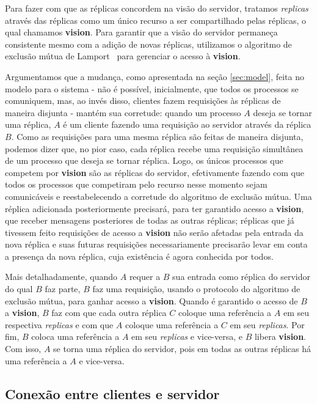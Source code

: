 \documentclass[../main.tex]{subfiles}
\begin{document}
Para fazer com que as réplicas concordem na visão do servidor, tratamos \textit{replicas} através das réplicas como um único recurso a ser compartilhado pelas réplicas, o qual chamamos \textbf{vision}.
Para garantir que a visão do servidor permaneça consistente mesmo com a adição de novas réplicas, utilizamos o algoritmo de exclusão mútua de Lamport~\cite{lamport-logical-clocks} para gerenciar o acesso à \textbf{vision}.

Argumentamos que a mudança, como apresentada na seção \ref{sec:model}, feita no modelo para o sistema - não é possível, inicialmente, que todos os processos se comuniquem, mas, ao invés disso, clientes fazem requisições às réplicas de maneira disjunta - mantém sua corretude: quando um processo $A$ deseja se tornar uma réplica, $A$ é um cliente fazendo uma requisição ao servidor através da réplica $B$.
Como as requisições para uma mesma réplica são feitas de maneira disjunta, podemos dizer que, no pior caso, cada réplica recebe uma requisição simultânea de um processo que deseja se tornar réplica.
Logo, os únicos processos que competem por \textbf{vision} são as réplicas do servidor, efetivamente fazendo com que todos os processos que competiram pelo recurso nesse momento sejam comunicáveis e reestabelecendo a corretude do algoritmo de exclusão mútua.
Uma réplica adicionada posteriormente precisará, para ter garantido acesso a \textbf{vision}, que receber mensagens posteriores de todas as outras réplicas; réplicas que já tivessem feito requisições de acesso a \textbf{vision} não serão afetadas pela entrada da nova réplica e suas futuras requisições necessariamente precisarão levar em conta a presença da nova réplica, cuja existência é agora conhecida por todos.

Mais detalhadamente, quando $A$ requer a $B$ sua entrada como réplica do servidor do qual $B$ faz parte, $B$ faz uma requisição, usando o protocolo do algoritmo de exclusão mútua, para ganhar acesso a \textbf{vision}.
Quando é garantido o acesso de $B$ a \textbf{vision}, $B$ faz com que cada outra réplica $C$ coloque uma referência a $A$ em seu respectiva \textit{replicas} e com que $A$ coloque uma referência a $C$ em seu \textit{replicas}.
Por fim, $B$ coloca uma referência a $A$ em seu \textit{replicas} e vice-versa, e $B$ libera \textbf{vision}.
Com isso, $A$ se torna uma réplica do servidor, pois em todas as outras réplicas há uma referência a $A$ e vice-versa.

\subsection{Conexão entre clientes e servidor}
\end{document}
